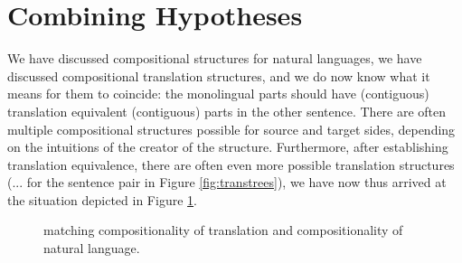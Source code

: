 \documentclass{report}
\theoremstyle{definition}
\theoremstyle{plain}
\begin{document}
\section{Combining Hypotheses}

We have discussed compositional structures for natural languages, we have discussed compositional translation structures, and we do now know what it means for them to coincide: the monolingual parts should have (contiguous) translation equivalent (contiguous) parts in the other sentence. There are often multiple compositional structures possible for source and target sides, depending on the intuitions of the creator of the structure. Furthermore, after establishing translation equivalence, there are often even more possible translation structures (... for the sentence pair in Figure \ref{fig:transtrees}), we have now thus arrived at the situation depicted in Figure  \ref{fig:comp2x}.

\begin{figure}[!ht]
\centering
{}
\caption{matching compositionality of translation and compositionality of natural language.}\label{fig:comp2x}
\end{figure}
\end{document}
